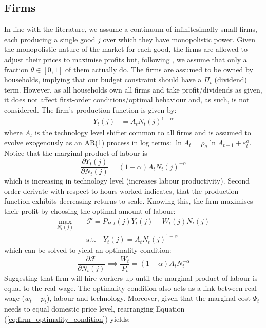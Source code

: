 \subsection{Firms}
In line with the literature, we assume a continuum of infinitesimally small firms, each producing a single good $j$ over which they have monopolistic power. Given the monopolistic nature of the market for each good, the firms are allowed to adjust their prices to maximise profits but, following \textcite{calvo_1983_staggered}, we assume that only a fraction $\theta \in [0,1]$ of them actually do. The firms are assumed to be owned by households, implying that our budget constraint should have a $\Pi_t$ (dividend) term. However, as all households own all firms and take profit/dividends as given, it does not affect first-order conditions/optimal behaviour and, as such, is not considered. The firm's production function is given by: 
\begin{align}
    Y_t(j)   & = A_t {N_t(j)}^{1-\alpha}                         
\end{align}
where $A_t$ is the technology level shifter common to all firms and is assumed to evolve exogenously as an AR(1) process in log terms: $\ln A_t = \rho_a \ln A_{t-1} + \varepsilon^a_t$. Notice that the marginal product of labour is
\begin{equation}
    \frac{\partial Y_t(j)}{\partial N_t(j)} = (1-\alpha)A_t {N_t(j)}^{-\alpha}
\end{equation}
which is increasing in technology level (increases labour productivity). Second order derivate with respect to hours worked indicates, that the production function exhibits decreasing returns to scale. Knowing this, the firm maximises their profit by choosing the optimal amount of labour:
\begin{align}
    \max_{N_t(j)}             \quad & \mathcal{F} = P_{H,t}(j)Y_{t}(j) - W_t(j)N_{t}(j) \\
     & \text{s.t.} \quad  Y_t(j)    = A_t {N_t(j)}^{1-\alpha}     
\end{align}
which can be solved to yield an optimality condition:
\begin{equation}
    \frac{\partial \mathcal{F}}{\partial N_t(j)} \implies \frac{W_t}{P_t} = (1-\alpha)A_t N_t^{-\alpha} \label{eq:firm_optimality_condition}
\end{equation}
Suggesting that firm will hire workers up until the marginal product of labour is equal to the real wage. The optimality condition also acts as a link between real wage ($w_t - p_t$), labour and technology. Moreover, given that the marginal cost $\Psi_t$ needs to equal domestic price level, rearranging Equation (\ref{eq:firm_optimality_condition}) yields: 
